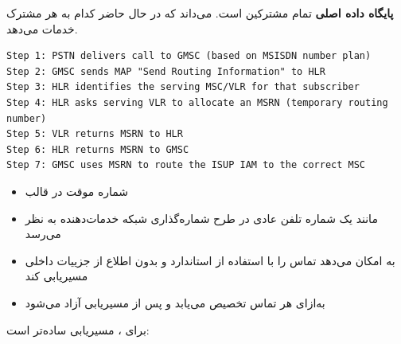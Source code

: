 





\CNchained{}

 \textbf{پایگاه داده اصلی} تمام مشترکین است. می‌داند که در حال حاضر کدام  به هر مشترک خدمات می‌دهد.


\def\CNcodelang{}

\begin{CNplaincode}
\begin{Verbatim}
Step 1: PSTN delivers call to GMSC (based on MSISDN number plan)
Step 2: GMSC sends MAP "Send Routing Information" to HLR
Step 3: HLR identifies the serving MSC/VLR for that subscriber
Step 4: HLR asks serving VLR to allocate an MSRN (temporary routing number)
Step 5: VLR returns MSRN to HLR
Step 6: HLR returns MSRN to GMSC
Step 7: GMSC uses MSRN to route the ISUP IAM to the correct MSC
\end{Verbatim}
\end{CNplaincode}


\begin{itemize}
\tightlist
\item
  شماره موقت در قالب 
\item
  مانند یک شماره تلفن عادی در طرح شماره‌گذاری شبکه خدمات‌دهنده به نظر می‌رسد
\item
  به  امکان می‌دهد تماس را با استفاده از  استاندارد و بدون اطلاع از جزییات داخلی  مسیریابی کند
\item
  به‌ازای هر تماس تخصیص می‌یابد و پس از مسیریابی آزاد می‌شود
\end{itemize}


برای ، مسیریابی ساده‌تر است:

